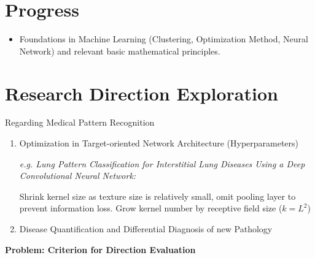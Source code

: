 \documentclass{article}
\begin{document}
\section{Progress}
    \begin{itemize}
        \item Foundations in Machine Learning (Clustering, Optimization Method, Neural Network)
        and relevant basic mathematical principles.
    \end{itemize}
\section{Research Direction Exploration}
    Regarding Medical Pattern Recognition
    \begin{enumerate}
        \item Optimization in Target-oriented Network Architecture (Hyperparameters)
        
        \textit{e.g. Lung Pattern Classification for Interstitial Lung Diseases Using a Deep
        Convolutional Neural Network:}

        Shrink kernel size as texture size is relatively small, omit pooling layer to
        prevent information loss. Grow kernel number by receptive 
        field size ($k=L^2$)

        \item Disease Quantification and Differential Diagnosis of new Pathology
    \end{enumerate}
    \textbf{Problem: Criterion for Direction Evaluation}
\end{document}
